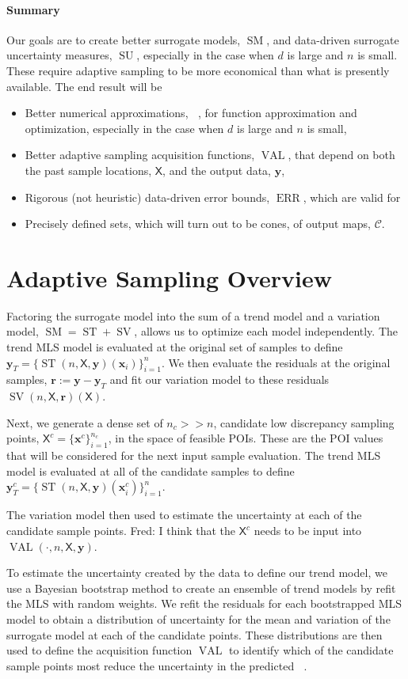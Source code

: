 \documentclass[11pt]{NSFamsart}
\DeclareMathOperator{\QOI}{QOI} %
\DeclareMathOperator{\APP}{\widehat{\QOI}}
\DeclareMathOperator{\SURR}{SM} %
\DeclareMathOperator{\STREND}{ST} %
\DeclareMathOperator{\SVAR}{SV} %
\DeclareMathOperator{\ERR}{ERR}
\DeclareMathOperator{\VAL}{VAL}
\DeclareMathOperator{\SURRERR}{SU}
\newcommand{\mX}{\mathsf{X}}
\newcommand{\bx}{{\boldsymbol{x}}}
\newcommand{\br}{{\boldsymbol{r}}}
\newcommand{\by}{{\boldsymbol{y}}}
\newcommand{\calc}{{\mathcal{C}}}
\newcommand{\FJHNote}[1]{{\color{blue}Fred: #1}}
\begin{document}
\paragraph*{Summary} 
Our goals are to create better surrogate models, $\SURR$, and data-driven surrogate uncertainty measures, $\SURRERR$, especially in the case when $d$ is large and $n$ is small.  These require adaptive sampling to be more economical than what is presently available.  The end result will be
\begin{itemize}
    \item Better numerical approximations, $\APP$, for function approximation and optimization, especially in the case when $d$ is large and $n$ is small, 
    \item Better adaptive sampling acquisition functions, $\VAL$, that depend on both the past sample locations, $\mX$, and the output data, $\by$,
    \item Rigorous (not heuristic) data-driven error bounds, $\ERR$, which are valid for
    \item Precisely defined sets, which will turn out to be cones, of output maps, $\calc$.
\end{itemize}

\section{Adaptive Sampling Overview}
Factoring  the surrogate model into the sum of a trend model and a variation model,  $\SURR = \STREND + \SVAR$, allows us to optimize each model independently.   
The trend MLS model is evaluated at the original set of samples to define $\by_T = \{ \STREND(n,\mX,\by)(\bx_i) \}_{i=1}^n$.
We then evaluate the residuals at the original samples, $\br:=\by-\by_T$ and fit our variation model to these residuals $\SVAR(n,\mX,\br)(\mX)$.

Next, we generate a dense set of $n_c >> n$, candidate low discrepancy sampling points, 
$\mX^c = \{ \bx^c \}_{i=1}^{n_c}$,  in the space of feasible POIs.  
These are the POI values that will be considered for the next input sample evaluation.   
The trend MLS model is evaluated at all of  the candidate samples to define  $\by^c_T = \{ \STREND(n,\mX,\by)(\bx^c_i) \}_{i=1}^n$.

The variation model then used to estimate the uncertainty at each of the candidate sample points.  \FJHNote{I think that the $\mX^c$ needs to be input into $\VAL(\cdot, n, \mX, \by)$.}

To estimate the uncertainty created by the data to define our trend model, we use a Bayesian bootstrap method to create an ensemble of trend models by refit the MLS with random weights.
We refit the residuals for each bootstrapped MLS model to obtain a distribution of uncertainty for the mean and variation of the surrogate model at each of the candidate points. 
These distributions are then used to define the acquisition function $\VAL$ to identify which of the candidate sample points most reduce the uncertainty in the predicted $\APP$. 
\end{document}
